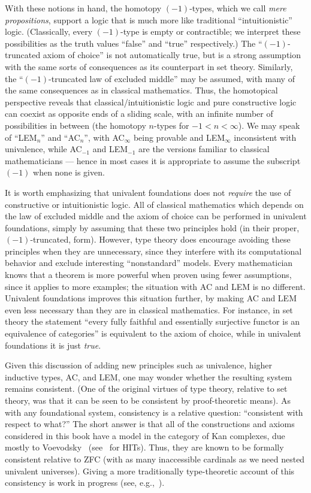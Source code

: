 {With these notions in hand, the homotopy $(-1)$-types, which we call \emph{mere propositions}, support a logic that is much more like traditional ``intuitionistic'' logic.
(Classically, every $(-1)$-type is empty or contractible; we interpret these possibilities as the truth values ``false'' and ``true'' respectively.)
The ``$(-1)$-truncated axiom of choice'' is not automatically true, but is a strong assumption with the same sorts of consequences as its counterpart in set theory.
Similarly, the ``$(-1)$-truncated law of excluded middle'' may be assumed, with many of the same consequences as in classical mathematics.
Thus, the homotopical perspective reveals that classical/intuitionistic logic and pure constructive logic can coexist as opposite ends of a sliding scale, with an infinite number of possibilities in between (the homotopy $n$-types for $-1 < n < \infty$).
We may speak of ``LEM$_n$'' and ``AC$_n$'', with AC$_\infty$ being provable and LEM$_\infty$ inconsistent with univalence, while AC$_{-1}$ and LEM$_{-1}$ are the versions familiar to classical mathematicians --- hence in most cases it is appropriate to assume the subscript $(-1)$ when none is given.

It is worth emphasizing that univalent foundations does not \emph{require} the use of constructive or intuitionistic logic.
All of classical mathematics which depends on the law of excluded middle and the axiom of choice can be performed in univalent foundations, simply by assuming that these two principles hold (in their proper, $(-1)$-truncated, form).
However, type theory does encourage avoiding these principles when they are unnecessary, since they interfere with its computational behavior and exclude interesting ``nonstandard'' models.
\mbox{Every} mathematician knows that a theorem is more powerful when proven using fewer assumptions, since it applies to more examples; the situation with AC and LEM is no different.
Univalent foundations improves this situation further, by making AC and LEM even less necessary than they are in classical mathematics.
For instance, in set theory the statement ``every fully faithful and essentially surjective functor is an equivalence of categories'' is equivalent to the axiom of choice, while in univalent foundations it is just \emph{true}.

Given this discussion of adding new principles such as univalence, higher inductive types, AC, and LEM, one may wonder whether the resulting system remains consistent.
(One of the original virtues of type theory, relative to set theory, was that it can be seen to be consistent by proof-theoretic means).
As with any foundational system, consistency is a relative question: ``consistent with respect to what?''
The short answer is that all of the constructions and axioms considered in this book have a model in the category of Kan complexes, due mostly to Voevodsky~\cite{klv:ssetmodel} (see~\cite{ls:hits} for HITs).
Thus, they are known to be formally consistent relative to ZFC (with as many inaccessible cardinals as we need nested univalent universes).
Giving a more traditionally type-theoretic account of this consistency is work in progress (see, e.g.,~\cite{lh:canonicity}).

}
